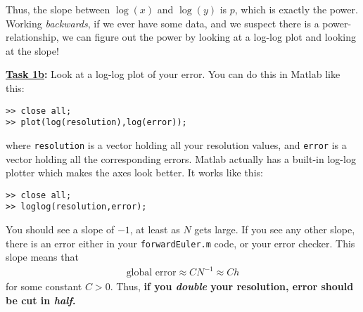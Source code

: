 \documentclass[10pt,reqno]{amsart}
\theoremstyle{plain}
\theoremstyle{definition}
\theoremstyle{remark}
\numberwithin{figure}{section}   %
\begin{document}
Thus, the slope between $\log(x)$ and $\log(y)$ is $p$, which is exactly the power.  Working \textit{backwards}, if we ever have some data, and we suspect there is a power-relationship, we can figure out the power by looking at a log-log plot and looking at the slope!

\bigskip

\noindent\textbf{\underline{Task 1b}:}  Look at a log-log plot of your error.  You can do this in Matlab like this:

\begin{minipage}[h]{5in}
\centering
\begin{lstlisting}
>> close all;
>> plot(log(resolution),log(error));
\end{lstlisting}
\end{minipage}

\noindent
where \texttt{resolution} is a vector holding all your resolution values, and \texttt{error} is a vector holding all the corresponding errors.  Matlab actually has a built-in log-log plotter which makes the axes look better.  It works like this:

\begin{minipage}[h]{5in}
\centering
\begin{lstlisting}
>> close all;
>> loglog(resolution,error);
\end{lstlisting}
\end{minipage}

You should see a slope of $-1$, at least as $N$ gets large.  If you see any other slope, there is an error either in your \texttt{forwardEuler.m} code, or your error checker.  
This slope means that 
\begin{align*}
 \text{global error} \approx CN^{-1} \approx Ch
\end{align*}
for some constant $C>0$.  Thus, \textbf{if you \textit{double} your resolution, error should be cut in \textit{half}.}

\bigskip
\end{document}
